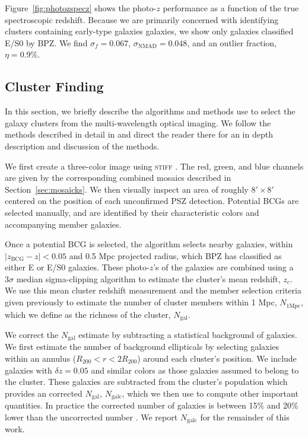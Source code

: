 \documentclass[apj, revtex4-1]{emulateapj}
\begin{document}
Figure~\ref{fig:photozspecz} shows the photo-$z$ performance as a function of the true spectroscopic redshift. Because we are primarily concerned with identifying clusters containing early-type galaxies galaxies, we show only galaxies classified E/S0 by BPZ. We find $\sigma_f = 0.067$, $\sigma_\mathrm{NMAD} = 0.048$, and an outlier fraction, $\eta = 0.9\%$.

\subsection{Cluster Finding}
In this section, we briefly describe the algorithms and methods use to select the galaxy clusters from the multi-wavelength optical imaging. We follow the methods described in detail in \cite{Menanteau2009a, Menanteau2010} and direct the reader there for an in depth description and discussion of the methods.

We first create a three-color image using \textsc{stiff} \citep{Bertin2011}. The red, green, and blue channels are given by the corresponding combined mosaics described in Section~\ref{sec:mosaicks}. We then visually inspect an area of roughly $8' \times 8'$ centered on the position of each unconfirmed PSZ detection. Potential BCGs are selected manually, and are identified by their characteristic colors and accompanying member galaxies.


Once a potential BCG is selected, the algorithm selects nearby galaxies, within $|z_\mathrm{BCG} - z| < 0.05$ and 0.5 Mpc projected radius, which BPZ has classified as either E or E/S0 galaxies. These photo-$z$'s of the galaxies are combined using a $3\sigma$ median sigma-clipping algorithm to estimate the cluster's mean redshift, $z_c$. We use this mean cluster redshift measurement and the member selection criteria given previously to estimate the number of cluster members within 1 Mpc, $N_\mathrm{1 Mpc}$, which we define as the richness  of the cluster, $N_\mathrm{gal}$.

We correct the $N_\mathrm{gal}$ estimate by subtracting a statistical background of galaxies. We first estimate the number of background ellipticals by selecting galaxies within an annulus ($R_{200} <r < 2R_{200}$) around each cluster's position. We include galaxies with $\delta z = 0.05$ and similar colors as those galaxies assumed to belong to the cluster. These galaxies are subtracted from the cluster's population which provides an corrected $N_\mathrm{gal}$, $N_\mathrm{galc}$, which we then use to compute other important quantities. In practice the corrected number of galaxies is between 15\% and 20\% lower than the uncorrected number \citep{Menanteau2010}. We report $N_\mathrm{galc}$ for the remainder of this work.
\end{document}
